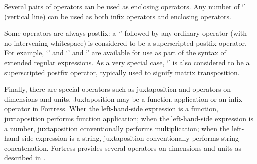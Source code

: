 Several pairs of operators can be used as enclosing operators.  Any number
of `\txt{|}' (vertical line) can be used as both infix operators and
enclosing operators.


Some operators are always postfix: a `' followed by
any ordinary operator (with no intervening whitespace) is considered to be a
superscripted postfix operator.  For example, `' and
`' and `'
are available for use as part
of the syntax of extended regular expressions.  As a very special case,
`' is also considered to be a superscripted
postfix operator,
typically used to signify matrix transposition.


Finally, there are special operators such as juxtaposition
and operators on dimensions and units.
Juxtaposition may be a function application or
an infix operator in Fortress.
When the left-hand-side expression is a function, juxtaposition performs
function application; when the left-hand-side expression is a number,
juxtaposition conventionally performs multiplication; when the
left-hand-side expression is a string,
juxtaposition conventionally performs string concatenation.
Fortress provides several operators on dimensions and units
as described in .
